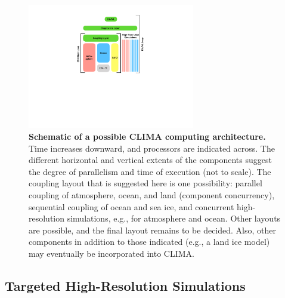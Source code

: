 \documentclass{article}
\begin{document}
\begin{figure}[htb]
\centerline{\includegraphics[width=0.65\textwidth]{CLIMA-layers.pdf}}
\caption{\textbf{Schematic of a possible CLIMA computing architecture.} Time increases downward, and processors are indicated across. The different horizontal and vertical extents of the components suggest the degree of parallelism and time of execution (not to scale). The coupling layout that is suggested here is one possibility: parallel coupling of atmosphere, ocean, and land (component concurrency), sequential coupling of ocean and sea ice, and concurrent high-resolution simulations, e.g., for atmosphere and ocean. Other layouts are possible, and the final layout remains to be decided. Also, other components in addition to those indicated (e.g., a land ice model) may eventually be incorporated into CLIMA.}
\label{f:CLIMA-layers}
\end{figure}

\subsection{Targeted High-Resolution Simulations}
\end{document}
